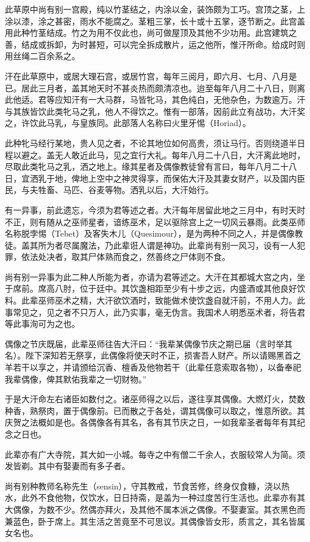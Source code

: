 \documentclass[12pt,UTF8]{ctexbook}
\begin{document}
此草原中尚有别一宫殿，纯以竹茎结之，内涂以金，装饰颇为工巧。宫顶之茎，上涂以漆，涂之甚密，雨水不能腐之。茎粗三掌，长十或十五掌，逐节断之。此宫盖用此种竹茎结成。竹之为用不仅此也，尚可做屋顶及其他不少功用。此宫建筑之善，结成或拆卸，为时甚短，可以完全拆成散片，运之他所，惟汗所命。给成时则用丝绳二百余系之。

汗在此草原中，或居大理石宫，或居竹宫，每年三阅月，即六月、七月、八月是已。居此三月者，盖其地天时不甚炎热而颇清凉也。迨至每年八月二十八日，则离此他适。君等应知汗有一大马群，马皆牝马，其色纯白，无他杂色，为数逾万。汗与其族皆饮此类牝马之乳，他人不得饮之。惟有一部落，因前此立有战功，大汗奖之，许饮此马乳，与皇族同。此部落人名称曰火里牙惕（Horiad）。

此种牝马经行某地，贵人见之者，不论其地位如何高贵，须让马行。否则绕道半日程以避之。盖无人敢近此马，见之宜行大礼。每年八月二十八日，大汗离此地时，尽取此类牝马之乳，洒之地上。缘其星者及偶像教徒曾有言曰，每年八月二十八日，宜洒乳于地，俾地上空中之神灵得享，而保佑大汗及其妻女财产，以及国内臣民，与夫牲畜、马匹、谷麦等物。洒乳以后，大汗始行。

有一异事，前此遗忘，今须为君等述之者。大汗每年居留此地之三月中，有时天时不正，则有随从之巫师星者，谙练巫术，足以驱除宫上之一切风云暴雨。此类巫师名称脱孛惕（Tebet）及客失木儿（Quesimour），是为两种不同之人，并是偶像教徒。盖其所为者尽属魔法，乃此辈诳人谓是神功。此辈尚有别一风习，设有一人犯罪，依法处决者，取其尸体熟而食之，然善终之尸体则不食。

尚有别一异事为此二种人所能为者，亦请为君等述之。大汗在其都城大宫之内，坐于席前。席高八肘，位于廷中。其饮盏相距至少有十步之远，内盛酒或其他良好饮料。此辈巫师巫术之精，大汗欲饮酒时，致能做术使饮盏自就汗前，不用人力。此事常见之，见之者不只万人，此乃实事，毫无伪言。我国术人明悉巫术者，将告君等此事洵可为之也。

偶像之节庆既届，此辈巫师往告大汗曰：“我辈某偶像节庆之期已届（言时举其名）。陛下深知若无祭享，此偶像将使天时不正，损害吾人财产。所以请赐黑首之羊若干以享之，并请颁给沉香、檀香及他物若干（此辈任意索取各物），以备奉祀我辈偶像，俾其默佑我辈之一切财物。”

于是大汗命左右诸臣如数付之。诸巫师得之以后，遂往享其偶像。大燃灯火，焚数种香，熟祭肉，置于偶像前。已而散之于各处，谓其偶像可以取之，惟意所欲。其庆贺之法概如是也。各偶像各有其名，各有其节庆之日，一如我辈圣者每年有其纪念之日也。

此辈亦有广大寺院，其大如一小城。每寺之中有僧二千余人，衣服较常人为简。须发皆剃。其中有娶妻而有多子者。

尚有别种教师名称先生（sensin），守其教戒，节食苦修，终身仅食糠，浇以热水，此外不食他物，仅饮水，日日持斋，是盖为一种过度苦行生活也。此辈亦有其大偶像，为数不少。然偶亦拜火，及其他不属本派之偶像。不娶妻室。其衣黑色而兼蓝色，卧于席上。其生活之苦竟至不可思议。其偶像皆女形，质言之，其名皆属女名也。
\end{document}
